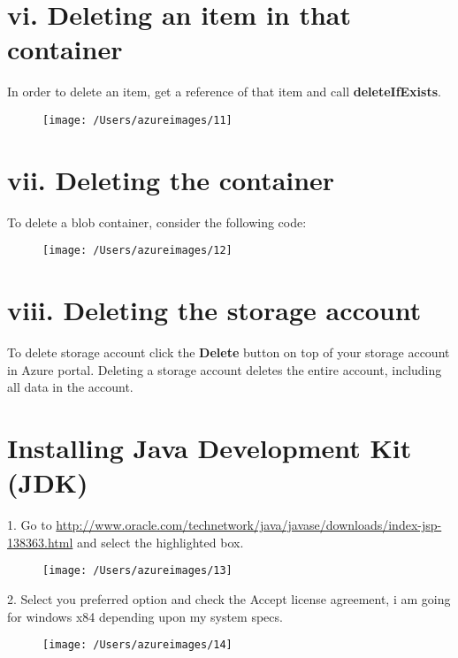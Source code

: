 \documentclass[12pt, letterpaper, twoside]{article}
\begin{document}
\cleardoublepage 		
\section*{vi. Deleting an item in that container}
In order to delete an item, get a reference of that item and call \textbf{deleteIfExists}.
\begin{figure}[H]
	\centering
	\texttt{[image: /Users/azureimages/11]}
\end{figure}
\section*{vii. Deleting the container}
To delete a blob container, consider the following code:
\begin{figure}[H]
	\centering
	\texttt{[image: /Users/azureimages/12]}
\end{figure}
\vspace{1cm}
 \section*{viii. Deleting the storage account}	
 To delete storage account click the \textbf{Delete} button on top of your storage account in Azure portal. Deleting a storage account deletes the entire account, including all data in the account.	
\clearpage
\section*{Installing Java Development Kit (JDK)}
1. Go to \underline{http://www.oracle.com/technetwork/java/javase/downloads/index-jsp-138363.html} and select the highlighted box.
\begin{figure}[H]
	\centering
	\texttt{[image: /Users/azureimages/13]}
\end{figure}
2. Select you preferred option and check the Accept license agreement, i am going for windows x84 depending upon my system specs.
\begin{figure}[H]
	\centering
	\texttt{[image: /Users/azureimages/14]}
\end{figure}
  		
 		
\end{document}
